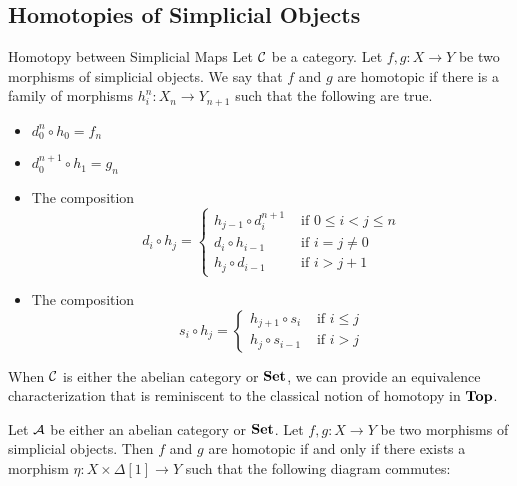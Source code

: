 \documentclass[a4paper]{article}
\begin{document}
\subsection{Homotopies of Simplicial Objects}
\begin{defn}{Homotopy between Simplicial Maps}{} Let $\mathcal{C}$ be a category. Let $f,g:X\to Y$ be two morphisms of simplicial objects. We say that $f$ and $g$ are homotopic if there is a family of morphisms $h_i^n:X_n\to Y_{n+1}$ such that the following are true. 
\begin{itemize}
\item $d_0^n\circ h_0=f_n$
\item $d_0^{n+1}\circ h_1=g_n$
\item The composition $$d_i\circ h_j=\begin{cases}
h_{j-1}\circ d_i^{n+1} & \text{ if } 0\leq i<j\leq n\\
d_i\circ h_{i-1} & \text{ if } i=j\neq 0\\
h_j\circ d_{i-1}& \text{ if } i>j+1
\end{cases}$$
\item The composition $$s_i\circ h_j=\begin{cases}
h_{j+1}\circ s_i & \text{ if } i\leq j\\
h_j\circ s_{i-1} & \text{ if } i>j
\end{cases}$$
\end{itemize}
\end{defn}

When $\mathcal{C}$ is either the abelian category or $\bold{Set}$, we can provide an equivalence characterization that is reminiscent to the classical notion of homotopy in $\bold{Top}$. 

\begin{thm}{}{} Let $\mathcal{A}$ be either an abelian category or $\bold{Set}$. Let $f,g:X\to Y$ be two morphisms of simplicial objects. Then $f$ and $g$ are homotopic if and only if there exists a morphism $\eta:X\times\Delta[1]\to Y$ such that the following diagram commutes: \\~\\
\\~\\
\end{thm}
\end{document}
